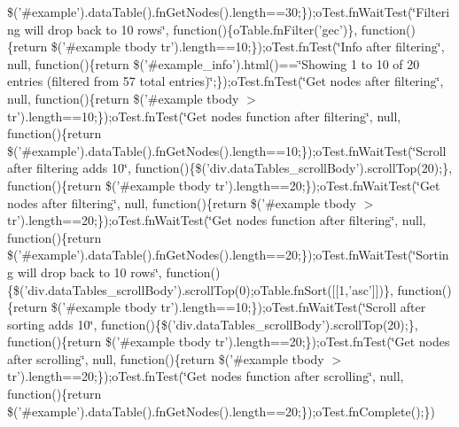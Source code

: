 \begin{DoxyCompactItemize}
\$('\#example').\+data\+Table().\+fn\+Get\+Nodes().\+length==30;\});o\+Test.\+fn\+Wait\+Test(\char`\"{}\+Filtering will drop back to 10 rows\char`\"{}, function()\{o\+Table.\+fn\+Filter('gec')\}, function()\{return \$('\#example tbody tr').\+length==10;\});o\+Test.\+fn\+Test(\char`\"{}\+Info after filtering\char`\"{}, null, function()\{return \$('\#example\+\_\+info').\+html()==\char`\"{}\+Showing 1 to 10 of 20 entries (filtered from 57 total entries)\char`\"{};\});o\+Test.\+fn\+Test(\char`\"{}\+Get nodes after filtering\char`\"{}, null, function()\{return \$('\#example tbody $>$tr').\+length==10;\});o\+Test.\+fn\+Test(\char`\"{}\+Get nodes function after filtering\char`\"{}, null, function()\{return \$('\#example').\+data\+Table().\+fn\+Get\+Nodes().\+length==10;\});o\+Test.\+fn\+Wait\+Test(\char`\"{}\+Scroll after filtering adds 10\char`\"{}, function()\{\$('div.\+data\+Tables\+\_\+scroll\+Body').\+scroll\+Top(20);\}, function()\{return \$('\#example tbody tr').\+length==20;\});o\+Test.\+fn\+Wait\+Test(\char`\"{}\+Get nodes after filtering\char`\"{}, null, function()\{return \$('\#example tbody $>$tr').\+length==20;\});o\+Test.\+fn\+Wait\+Test(\char`\"{}\+Get nodes function after filtering\char`\"{}, null, function()\{return \$('\#example').\+data\+Table().\+fn\+Get\+Nodes().\+length==20;\});o\+Test.\+fn\+Wait\+Test(\char`\"{}\+Sorting will drop back to 10 rows\char`\"{}, function()\{\$('div.\+data\+Tables\+\_\+scroll\+Body').\+scroll\+Top(0);o\+Table.\+fn\+Sort(\mbox{[}\mbox{[}1,'asc'\mbox{]}\mbox{]})\}, function()\{return \$('\#example tbody tr').\+length==10;\});o\+Test.\+fn\+Wait\+Test(\char`\"{}\+Scroll after sorting adds 10\char`\"{}, function()\{\$('div.\+data\+Tables\+\_\+scroll\+Body').\+scroll\+Top(20);\}, function()\{return \$('\#example tbody tr').\+length==20;\});o\+Test.\+fn\+Test(\char`\"{}\+Get nodes after scrolling\char`\"{}, null, function()\{return \$('\#example tbody $>$tr').\+length==20;\});o\+Test.\+fn\+Test(\char`\"{}\+Get nodes function after scrolling\char`\"{}, null, function()\{return \$('\#example').\+data\+Table().\+fn\+Get\+Nodes().\+length==20;\});o\+Test.\+fn\+Complete();\})
\end{DoxyCompactItemize}


